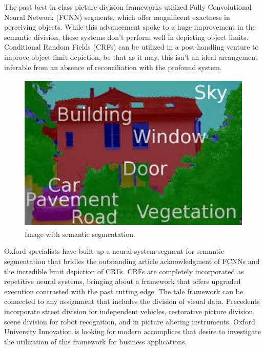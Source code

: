The past best in class picture division frameworks utilized Fully Convolutional Neural Network (FCNN) segments, which offer magnificent exactness in perceiving objects. While this advancement spoke to a huge improvement in the semantic division, these systems don't perform well in depicting object limits. Conditional Random Fields  (CRFs) can be utilized in a post-handling venture to improve object limit depiction, be that as it may, this isn't an ideal arrangement inferable from an absence of reconciliation with the profound system.
\begin{figure}[H]
  \centering
  \includegraphics[height=3in]{images/semantic.jpg}
   \caption{Image with semantic segmentation.}
\end{figure}
Oxford specialists have built up a neural system segment for semantic segmentation that bridles the outstanding article acknowledgment of FCNNs and the incredible limit depiction of CRFs. CRFs are completely incorporated as repetitive neural systems, bringing about a framework that offers upgraded execution contrasted with the past cutting edge. The tale framework can be connected to any assignment that includes the division of visual data. Precedents incorporate street division for independent vehicles, restorative picture division, scene division for robot recognition, and in picture altering instruments. Oxford University Innovation is looking for modern accomplices that desire to investigate the utilization of this framework for business applications.
